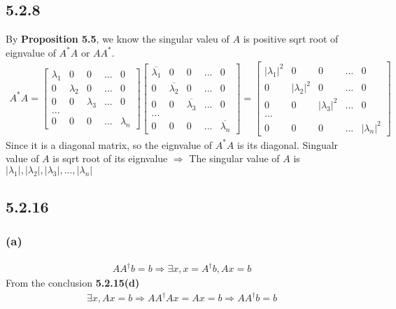 \documentclass{article}
\begin{document}
\subsection*{5.2.8}
By \textbf{Proposition 5.5}, we know the singular valeu of $A$ is positive sqrt root of eignvalue of $A^*A$ or $AA^*$.
\begin{equation*}
    \begin{split}
        A^*A = \begin{bmatrix}
            \lambda_1 & 0 & 0 & ... & 0 \\
            0 & \lambda_2 & 0 & ... & 0 \\
            0 & 0 & \lambda_3 & ... & 0 \\
            ...\\
            0 & 0 & 0 & ... & \lambda_n 
        \end{bmatrix} \begin{bmatrix}
            \overline{\lambda_1} & 0 & 0 & ... & 0 \\
            0 & \overline{\lambda_2} & 0 & ... & 0 \\
            0 & 0 & \overline{\lambda_3} & ... & 0 \\
            ...\\
            0 & 0 & 0 & ... & \overline{\lambda_n}
        \end{bmatrix} = \begin{bmatrix}
            |\lambda_1|^2 & 0 & 0 & ... & 0 \\
            0 & |\lambda_2|^2 & 0 & ... & 0 \\
            0 & 0 & |\lambda_3|^2 & ... & 0 \\
            ...\\
            0 & 0 & 0 & ... & |\lambda_n|^2
        \end{bmatrix}
    \end{split}
\end{equation*}
Since it is a diagonal matrix, so the eignvalue of $A^*A$ is its diagonal. Singualr value of $A$ is sqrt root of its eignvalue $\Rightarrow$
The singular value of $A$ is $|\lambda_1|, |\lambda_2|, |\lambda_3|, ..., |\lambda_n|$


\subsection*{5.2.16}
\subsubsection*{(a)}
\begin{equation*}
    \begin{split}
        AA^\dagger b = b \Rightarrow \exists x, x= A^\dagger b, Ax = b
    \end{split}
\end{equation*}
From the conclusion \textbf{5.2.15(d)}
\begin{equation*}
    \begin{split}
        \exists x, Ax = b \Rightarrow AA^\dagger A x = Ax = b \Rightarrow AA^\dagger b = b
    \end{split}
\end{equation*}
\end{document}

